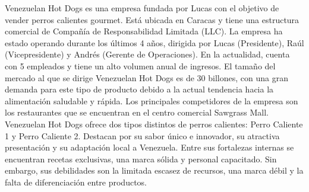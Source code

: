 Venezuelan Hot Dogs es una empresa fundada por Lucas con el objetivo de vender perros calientes gourmet. Está ubicada en Caracas y tiene una estructura comercial de Compañía de Responsabilidad Limitada (LLC). La empresa ha estado operando durante los últimos 4 años, dirigida por Lucas (Presidente), Raúl (Vicepresidente) y Andrés (Gerente de Operaciones). En la actualidad, cuenta con 5 empleados y tiene un alto volumen anual de ingresos. El tamaño del mercado al que se dirige Venezuelan Hot Dogs es de 30 billones, con una gran demanda para este tipo de producto debido a la actual tendencia hacia la alimentación saludable y rápida. Los principales competidores de la empresa son los restaurantes que se encuentran en el centro comercial Sawgrass Mall.
Venezuelan Hot Dogs ofrece dos tipos distintos de perros calientes: Perro Caliente 1 y Perro Caliente 2. Destacan por su sabor único e innovador, su atractiva presentación y su adaptación local a Venezuela. Entre sus fortalezas internas se encuentran recetas exclusivas, una marca sólida y personal capacitado. Sin embargo, sus debilidades son la limitada escasez de recursos, una marca débil y la falta de diferenciación entre productos.
 
